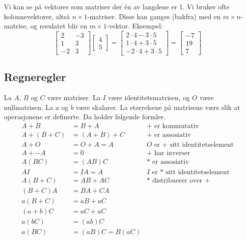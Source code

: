 \documentclass[12pt,a4paper,norsk]{article}
\newcommand{\imat}[1]{\left[\begin{smallmatrix}#1\end{smallmatrix}\right]} %
\begin{document}
Vi kan se på vektorer som matriser der én av langdene er 1. Vi bruker ofte
kolonnevektorer, altså $n \times 1$-matriser. Disse kan ganges (bakfra) med en
$m \times n$-matrise, og resulatet blir en $m \times 1$-vektor. Eksempel:
\[\imat{2 & -3 \\ 1 & 3 \\ -2 & 3}\imat{4 \\ 5} = \imat{2\cdot4 -3\cdot5 \\ 1\cdot4 + 3\cdot5 \\ -2\cdot4 + 3\cdot5} = \imat{-7 \\ 19 \\ 7}\]

\subsection{Regneregler}
La $A$, $B$ og $C$ være matriser. La $I$ være identitetsmatrisen, og $O$ være
nullmatrisen. La $a$ og $b$ være skalarer. La størrelsene på matrisene være slik
at operasjonene er definerte. Da holder følgende formler.
\begin{align*}
  A + B &= B + A & \text{+ er kommutativ} \\
  A + (B + C) &= (A + B) + C & \text{+ er assosiativ} \\
  A + O &= O + A = A & \text{$O$ er + sitt identitetselement} \\
  A + -A &= 0 & \text{+ har inverser} \\
  A(BC) &= (AB)C & \text{* er assosiativ} \\
  AI &= IA = A & \text{$I$ er * sitt identitetselement} \\
  A(B + C) &= AB + AC & \text{* distribuerer over +} \\
  (B + C)A &= BA + CA \\
  a(B + C) &= aB + aC \\
  (a + b)C &= aC + aC \\
  a(bC) &= (ab)C \\
  a(BC) &= (aB)C = B(aC)
\end{align*}
\end{document}
